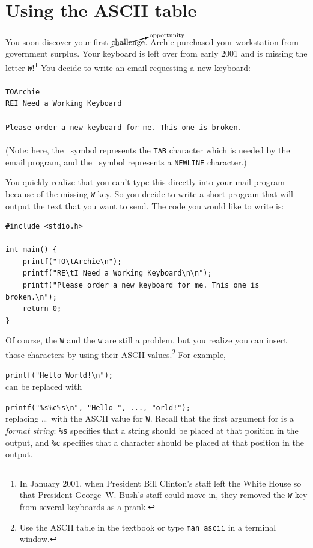 \section{Using the ASCII table}

You soon discover your first
$\cancelto{\mathrm{opportunity}}{\mathrm{challenge}}$. Archie purchased your
workstation from government surplus. Your keyboard is left over from early
2001 and is missing the letter \textit{\texttt{W}}!\footnote{In January 2001,
when President Bill Clinton's staff left the White House so that President
George~W. Bush's staff could move in, they removed the \textit{\texttt{W}} key
from several keyboards as a prank.} You decide to write an email requesting a
new keyboard: \\
\\
\texttt{TO\tab Archie\nl} \\
\texttt{RE\tab I Need a Working Keyboard\nl} \\
\nl \\
\texttt{Please order a new keyboard for me. This one is broken.\nl } \\ \\
(Note: here, the \tab\ symbol represents the \texttt{TAB} character which is
needed by the email program, and the \nl\ symbol represents a \texttt{NEWLINE}
character.)

You quickly realize that you can't type this directly into your mail program
because of the missing \textit{\texttt{W}} key. So you decide to write a short
program that will output the text that you want to send. The code you would
like to write is:

\begin{lstlisting}
#include <stdio.h>

int main() {
    printf("TO\tArchie\n");
    printf("RE\tI Need a Working Keyboard\n\n");
    printf("Please order a new keyboard for me. This one is broken.\n");
    return 0;
}
\end{lstlisting}

Of course, the \texttt{W} and the \texttt{w} are still a problem, but you
realize you can insert those characters by using their ASCII
values.\footnote{Use the ASCII table in the textbook or type \texttt{man ascii}
in a terminal window.} For example,

\lstinline{printf("Hello World!\n");} \\
can be replaced with

\lstinline{printf("%s%c%s\n", "Hello ", ..., "orld!");} \\
replacing \dots\ with the ASCII value for \texttt{W}. Recall that the first
argument for  is a \textit{format string}: \texttt{\%s}
specifies that a string should be placed at that position in the output, and
\texttt{\%c} specifies that a character should be placed at that position in
the output.

